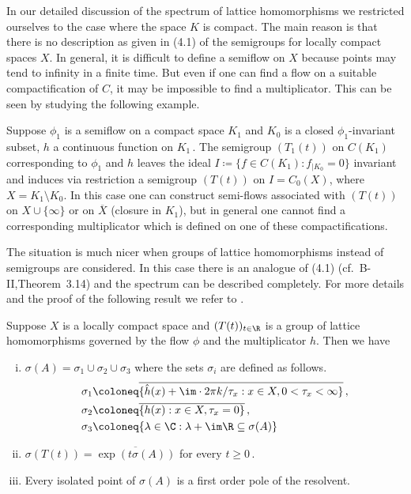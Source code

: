 	In our detailed discussion of the spectrum of lattice homomorphisms we restricted ourselves to the case where the space $K$ is compact.
	The main reason is that there is no description as given in (4.1) of the semigroups for locally compact spaces $X$.
	In general, it is difficult to define a semiflow on $X$ because points may tend to infinity in a finite time.
	But even if one can find a flow on a suitable compactification of $C$, it may be impossible to find a multiplicator.
	This can be seen by studying the following example.
	
	Suppose $\phi_{1}$ is a semiflow on a compact space $K_{1}$ and $K_{0}$ is a closed $\phi_{1}$-invariant subset, $h$ a continuous function on $K_{1}$\,.
%
The semigroup $(T_{1}(t))$ on $C(K_{1})$ corresponding to $\phi_{1}$ and $h$ leaves the ideal $I \coloneq \{f \in C(K_{1}) : f_{|K_{0}} = 0\}$ invariant and induces via restriction a semigroup $(T(t))$ on $I = C_{0}(X)$, where $X = K_{1} \setminus K_{0}$.
In this case one can construct semi-flows associated with $(T(t))$ on $X\cup\{\infty\}$ or on $\overline{X}$ (closure in $K_{1}$), but in general one cannot find a corresponding multiplicator which is defined on one of these compactifications.

The situation is much nicer when groups of lattice homomorphisms instead of semigroups are considered.
In this case there is an analogue of (4.1) (cf.\ B-II,Theorem~3.14) and the spectrum can be described completely.
For more details and the proof of the following result we refer to \citet{arendtgreiner:1984}.
\begin{theorem}\label{thm:b3-4.11}
	Suppose $X$ is a locally compact space and $(T(t))_{t\in\R}$ is a group of lattice homomorphisms governed by the flow $\phi$ and the multiplicator $h$.
	Then we have
	\begin{enumerate}[(i)]
		\item 
		$\sigma(A) = \sigma_{1}\cup\sigma_{2}\cup\sigma_{3}$ where the sets $\sigma_{i}$ are defined as follows.
		\[\begin{aligned}
			\sigma_{1} &\coloneq \overline{\{\hat{h}(x) + \im\cdot 2\pi k/\tau_{x} : x \in X, 0 < \tau_{x} < \infty\}}\,, \\
			\sigma_{2} &\coloneq \overline{\{h(x) : x \in X, \tau_{x} = 0\}}\,, \\
			\sigma_{3} &\coloneq \{\lambda \in \C : \lambda + \im\R \subseteq \sigma(A)\}
		\end{aligned}\]
		
		\item 
		$\sigma(T(t)) = \overline{\exp(t\sigma(A))}$ for every $t \geq 0$\,.
		
		\item 
		Every isolated point of $\sigma(A)$ is a first order pole of the resolvent.
	\end{enumerate}
\end{theorem}

